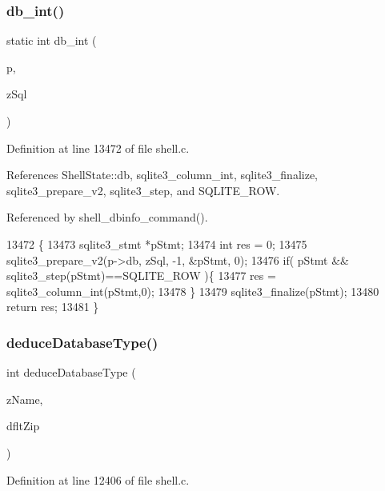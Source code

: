 \subsubsection{db\+\_\+int()}
{\footnotesize\ttfamily static int db\+\_\+int (\begin{DoxyParamCaption}\item[{\textbf{ Shell\+State} $\ast$}]{p,  }\item[{const char $\ast$}]{z\+Sql }\end{DoxyParamCaption})\hspace{0.3cm}{\ttfamily [static]}}



Definition at line 13472 of file shell.\+c.



References Shell\+State\+::db, sqlite3\+\_\+column\+\_\+int, sqlite3\+\_\+finalize, sqlite3\+\_\+prepare\+\_\+v2, sqlite3\+\_\+step, and S\+Q\+L\+I\+T\+E\+\_\+\+R\+OW.



Referenced by shell\+\_\+dbinfo\+\_\+command().


\begin{DoxyCode}
13472                                                   \{
13473   sqlite3_stmt *pStmt;
13474   \textcolor{keywordtype}{int} res = 0;
13475   sqlite3_prepare_v2(p->db, zSql, -1, &pStmt, 0);
13476   \textcolor{keywordflow}{if}( pStmt && sqlite3_step(pStmt)==SQLITE_ROW )\{
13477     res = sqlite3_column_int(pStmt,0);
13478   \}
13479   sqlite3_finalize(pStmt);
13480   \textcolor{keywordflow}{return} res;
13481 \}
\end{DoxyCode}
\mbox{\label{shell_8c_aa5662f177794e05c3bb71ecfe9989031}} 
\subsubsection{deduce\+Database\+Type()}
{\footnotesize\ttfamily int deduce\+Database\+Type (\begin{DoxyParamCaption}\item[{const char $\ast$}]{z\+Name,  }\item[{int}]{dflt\+Zip }\end{DoxyParamCaption})}



Definition at line 12406 of file shell.\+c.



